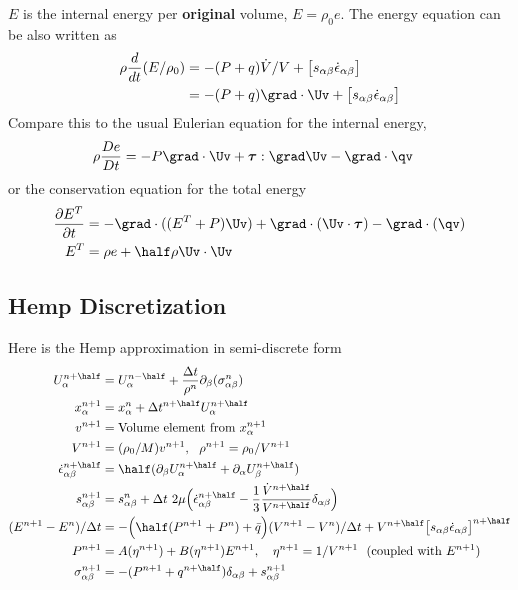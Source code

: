  $E$ is the internal energy per {\bf original} volume, $E=\rho_0 e$.
The energy equation can be also written as 
\begin{align}
  \rho {d\over dt}(E/\rho_0) &= -(P+q) \dot{V}/V + \big[ s_{\alpha\beta} \dot{\epsilon}_{\alpha\beta} \big]\\
      &=  - (P+q)\grad\cdot\Uv + \big[ s_{\alpha\beta} \dot{\epsilon}_{\alpha\beta} \big]
\end{align}
Compare this to the usual Eulerian equation for the internal energy,
\begin{align}
\rho {D e\over Dt} &= -P\grad\cdot\Uv + \tauv:\grad\Uv  - \grad\cdot\qv
\end{align}
or the conservation equation for the total energy 
\begin{align}
{\partial E^T \over\partial t} &= -\grad\cdot( (E^T+P)\Uv) + \grad\cdot(\Uv\cdot\tauv) -
                                           \grad\cdot(\qv ) \\
  E^T &= \rho e + \half\rho \Uv\cdot\Uv 
\end{align}

\subsection{Hemp Discretization}

Here is the Hemp approximation in semi-discrete form 
\begin{align}
  U_{\alpha}^{n+\half} &=  U_{\alpha}^{n-\half} + {\dt \over \rho^n} \partial_\beta( \sigma_{\alpha\beta}^n ) \\
  x_{\alpha}^{n+1} &= x_{\alpha}^{n} + \dt^{n+\half} U_{\alpha}^{n+\half} \\
  v^{n+1} &= \text{Volume element from $x_{\alpha}^{n+1}$} \\
  V^{n+1} &= ({\rho_0/M}) v^{n+1}, ~~ \rho^{n+1} = \rho_0/V^{n+1} \\
  \dot{\epsilon}_{\alpha\beta}^{n+\half} &= 
            \half( \partial_\beta U_{\alpha}^{n+\half} + \partial_\alpha U_{\beta}^{n+\half} ) \\
  s_{\alpha\beta}^{n+1} &= s_{\alpha\beta}^{n} + \dt~ 2 \mu\Big( \dot{\epsilon}_{\alpha\beta}^{n+\half} 
        -  \frac{1}{3}{\dot{V}^{n+\half}  \over V^{n+\half} }\delta_{\alpha\beta} \Big)  \label{eq:stressDeviators}\\
  (E^{n+1} -E^{n})/\dt &= -\Big( \half( P^{n+1} + P^n) + \bar{q} \Big)(V^{n+1}-V^n)/\dt  + 
               V^{n+\half}\big[ s_{\alpha\beta} \dot{\epsilon}_{\alpha\beta} \big]^{n+\half} \\
    P^{n+1} &= A(\eta^{n+1}) + B(\eta^{n+1}) E^{n+1}, \quad \eta^{n+1}=1/V^{n+1} ~~\text{(coupled with $E^{n+1}$)}\\
  \sigma_{\alpha\beta}^{n+1} &= -(P^{n+1}+q^{n+\half})\delta_{\alpha\beta} + s_{\alpha\beta}^{n+1}
\end{align}

